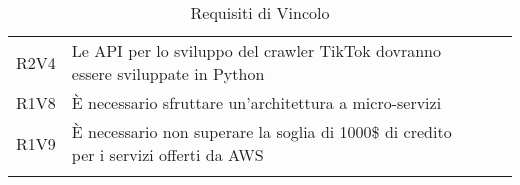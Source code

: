 \begin{longtable}{ m{}<{\centering}  m{}<{\centering}  m{}<{\centering}  m{}<{\centering}}
	R2V4 & Le API per lo sviluppo del crawler TikTok dovranno essere sviluppate in Python & \De & \Vi \\	
	 
	R1V8 & È necessario sfruttare un’architettura a micro-servizi & \Ob & \Ca \\	
	 
	R1V9 & È necessario non superare la soglia di 1000\$ di credito per i servizi offerti da AWS & \Ob & \Ve \\	
	
	\hiderowcolors \caption{Requisiti di Vincolo}
\end{longtable}

\pagebreak